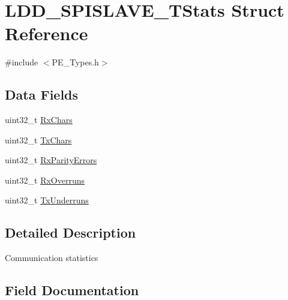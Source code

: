 \hypertarget{struct_l_d_d___s_p_i_s_l_a_v_e___t_stats}{}\section{L\+D\+D\+\_\+\+S\+P\+I\+S\+L\+A\+V\+E\+\_\+\+T\+Stats Struct Reference}
\label{struct_l_d_d___s_p_i_s_l_a_v_e___t_stats}


{\ttfamily \#include $<$P\+E\+\_\+\+Types.\+h$>$}

\subsection*{Data Fields}
\begin{DoxyCompactItemize}
\item 
uint32\+\_\+t \hyperlink{struct_l_d_d___s_p_i_s_l_a_v_e___t_stats_a95ff5c4048db62e6b700f6060c77c523}{Rx\+Chars}
\item 
uint32\+\_\+t \hyperlink{struct_l_d_d___s_p_i_s_l_a_v_e___t_stats_a13ec7f90be6f667d1b98595eb709ccc7}{Tx\+Chars}
\item 
uint32\+\_\+t \hyperlink{struct_l_d_d___s_p_i_s_l_a_v_e___t_stats_a30956a47d75d5c7305f1f9f7c0d70621}{Rx\+Parity\+Errors}
\item 
uint32\+\_\+t \hyperlink{struct_l_d_d___s_p_i_s_l_a_v_e___t_stats_a45862235648738550a10ad79292ef50c}{Rx\+Overruns}
\item 
uint32\+\_\+t \hyperlink{struct_l_d_d___s_p_i_s_l_a_v_e___t_stats_a9bb1db011f85a3c7644080f7cc482925}{Tx\+Underruns}
\end{DoxyCompactItemize}


\subsection{Detailed Description}
Communication statistics 

\subsection{Field Documentation}
\mbox{\label{struct_l_d_d___s_p_i_s_l_a_v_e___t_stats_a95ff5c4048db62e6b700f6060c77c523}} 
